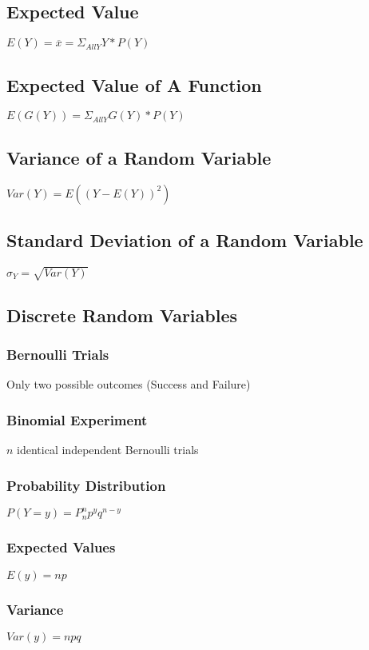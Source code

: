 \documentclass{hitec}
\begin{document}
\subsection*{Expected Value}
$E(Y) = \overline{x} = \Sigma_{All Y} Y * P(Y)$
\subsection*{Expected Value of A Function}
$E(G(Y)) = \Sigma_{All Y} G(Y) * P(Y)$
\subsection*{Variance of a Random Variable}
$Var(Y) = E((Y-E(Y))^2)$
\subsection*{Standard Deviation of a Random Variable}
$\sigma_Y = \sqrt{Var(Y)}$
\subsection*{Discrete Random Variables}
\subsubsection*{Bernoulli Trials}
Only two possible outcomes (Success and Failure)
\subsubsection*{Binomial Experiment}
$n$ identical independent Bernoulli trials
\subsubsection*{Probability Distribution}
$P(Y=y)=P^n_np^yq^{n-y}$
\subsubsection*{Expected Values}
$E(y)=np$
\subsubsection*{Variance}
$Var(y)=npq$
\end{document}
